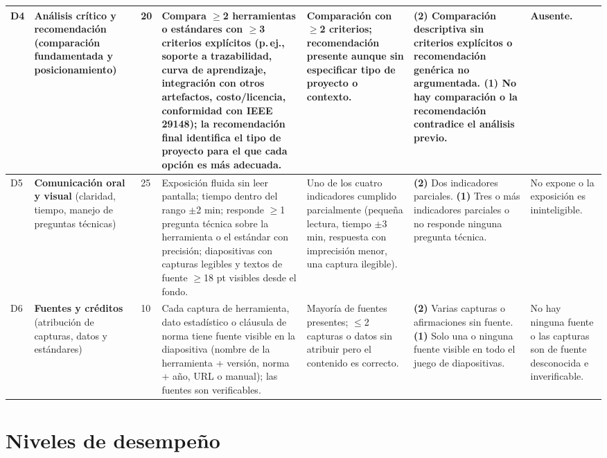 \documentclass[11pt]{article}
\begin{document}
{\begin{longtable}{|C{0.45cm}|L{2.4cm}|C{0.8cm}|L{3.0cm}|L{3.0cm}|L{3.0cm}|L{2.4cm}|}
	\hline
	 D4 & \textbf{Análisis crítico y recomendación} (comparación fundamentada y posicionamiento) & 20 & Compara $\geq$2 herramientas o estándares con $\geq$3 criterios explícitos (p.\,ej., soporte a trazabilidad, curva de aprendizaje, integración con otros artefactos, costo/licencia, conformidad con IEEE 29148); la recomendación final identifica el tipo de proyecto para el que cada opción es más adecuada. & Comparación con $\geq$2 criterios; recomendación presente aunque sin especificar tipo de proyecto o contexto. & \textbf{(2)} Comparación descriptiva sin criterios explícitos o recomendación genérica no argumentada. \textbf{(1)} No hay comparación o la recomendación contradice el análisis previo. & Ausente.\\
	\hline
	D5 & \textbf{Comunicación oral y visual} (claridad, tiempo, manejo de preguntas técnicas) & 25 & Exposición fluida sin leer pantalla; tiempo dentro del rango $\pm$2 min; responde $\geq$1 pregunta técnica sobre la herramienta o el estándar con precisión; diapositivas con capturas legibles y textos de fuente $\geq$18 pt visibles desde el fondo. & Uno de los cuatro indicadores cumplido parcialmente (pequeña lectura, tiempo $\pm$3 min, respuesta con imprecisión menor, una captura ilegible). & \textbf{(2)} Dos indicadores parciales. \textbf{(1)} Tres o más indicadores parciales o no responde ninguna pregunta técnica. & No expone o la exposición es ininteligible.\\
	\hline
	 D6 & \textbf{Fuentes y créditos} (atribución de capturas, datos y estándares) & 10 & Cada captura de herramienta, dato estadístico o cláusula de norma tiene fuente visible en la diapositiva (nombre de la herramienta + versión, norma + año, URL o manual); las fuentes son verificables. & Mayoría de fuentes presentes; $\leq$2 capturas o datos sin atribuir pero el contenido es correcto. & \textbf{(2)} Varias capturas o afirmaciones sin fuente. \textbf{(1)} Solo una o ninguna fuente visible en todo el juego de diapositivas. & No hay ninguna fuente o las capturas son de fuente desconocida e inverificable.\\
	\hline
\end{longtable}
}

\section{\textcolor{utegreendk}{Niveles de desempeño}}\label{sec:niveles}
\end{document}
